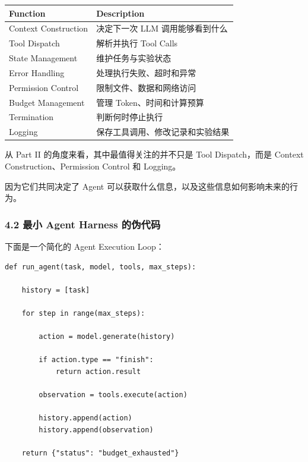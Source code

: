 \begin{readertable}
\begin{longtable}[]{@{}
  >{\raggedright\arraybackslash}p{}
  >{\raggedright\arraybackslash}p{}@{}}
\toprule
Function & Description \\
\midrule
\endhead
Context Construction & 决定下一次 LLM 调用能够看到什么 \\
Tool Dispatch & 解析并执行 Tool Calls \\
State Management & 维护任务与实验状态 \\
Error Handling & 处理执行失败、超时和异常 \\
Permission Control & 限制文件、数据和网络访问 \\
Budget Management & 管理 Token、时间和计算预算 \\
Termination & 判断何时停止执行 \\
Logging & 保存工具调用、修改记录和实验结果 \\
\bottomrule
\end{longtable}
\end{readertable}

从 Part II 的角度来看，其中最值得关注的并不只是 Tool Dispatch，而是 Context Construction、Permission Control 和 Logging。

因为它们共同决定了 Agent 可以获取什么信息，以及这些信息如何影响未来的行为。

\hypertarget{part-3-31-0001-ux6700ux5c0f-agent-harness-ux7684ux4f2aux4ee3ux7801}{%
\subsubsection{4.2 最小 Agent Harness 的伪代码}\label{part-3-31-0001-ux6700ux5c0f-agent-harness-ux7684ux4f2aux4ee3ux7801}}

下面是一个简化的 Agent Execution Loop：

\begin{verbatim}
def run_agent(task, model, tools, max_steps):

    history = [task]

    for step in range(max_steps):

        action = model.generate(history)

        if action.type == "finish":
            return action.result

        observation = tools.execute(action)

        history.append(action)
        history.append(observation)

    return {"status": "budget_exhausted"}
\end{verbatim}

